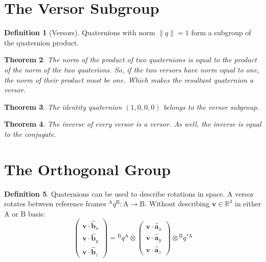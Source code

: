 \documentclass{amsart}
\newtheorem{theorem}{Theorem}[section]
\theoremstyle{definition}
\newtheorem{definition}[theorem]{Definition}
\theoremstyle{remark}
\numberwithin{equation}{section}
\begin{document}

\section{The Versor Subgroup}
  
\begin{definition}[Versors]
  Quaternions with norm $\|q\|=1$ form a subgroup of the quaternion product.
\end{definition}

\begin{theorem}
  The norm of the product of two quaternions is equal to the product of the norm of the two quaterions. So, if the two versors have norm equal to one, the norm of their product must be one. Which makes the resultant quaternion a versor.
\end{theorem}

\begin{theorem}
  The identity quaternion $(1, 0, 0, 0)$ belongs to the versor subgroup.
\end{theorem}

\begin{theorem}
  The inverse of every versor is a versor. As well, the inverse is equal to the conjugate.
\end{theorem}


\section{The Orthogonal Group}

\begin{definition}
  Quaternions can be used to describe rotations in space. A versor rotates between reference frames ${^\mathrm{A}q^\mathrm{B}}:\mathrm{A}\to\mathrm{B}$. Without describing $\mathbf{v}\in\mathbb{R}^3$ in either $\mathrm{A}$ or $\mathrm{B}$ basis:
  \begin{equation}
    \begin{pmatrix}
      \mathbf{v} \cdot \hat{\mathbf{b}}_x \\
      \mathbf{v} \cdot \hat{\mathbf{b}}_y \\
      \mathbf{v} \cdot \hat{\mathbf{b}}_z
    \end{pmatrix} = {^\mathrm{B}q^\mathrm{A}} \otimes 
    \begin{pmatrix}
      \mathbf{v} \cdot \hat{\mathbf{a}}_x \\
      \mathbf{v} \cdot \hat{\mathbf{a}}_y \\
      \mathbf{v} \cdot \hat{\mathbf{a}}_z
    \end{pmatrix} \otimes {^\mathrm{B}q^{*\mathrm{A}}}
  \end{equation}
\end{definition}
\end{document}

